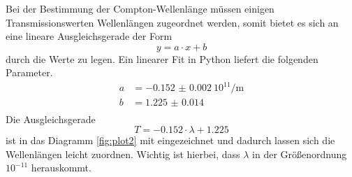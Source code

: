 Bei der Bestimmung der Compton-Wellenlänge müssen einigen Transmissionswerten Wellenlängen zugeordnet werden, somit bietet es sich an eine lineare Ausgleichsgerade der
Form
\begin{equation*}
y = a \cdot x + b
\end{equation*}
durch die Werte zu legen.
Ein linearer Fit in Python liefert die folgenden Parameter.
\begin{align*}
a &= \SI{-0.152(2)}{{10^{11}}\per\meter}\\
b &= \SI{1.225(14)}{}\\
\end{align*}
Die Ausgleichsgerade
\begin{equation}
\label{eqn:gerade}
T = -0.152 \cdot \lambda + 1.225
\end{equation}
ist in das Diagramm \ref{fig:plot2} mit eingezeichnet und dadurch lassen sich die Wellenlängen leicht zuordnen. Wichtig ist hierbei,
dass $\lambda$ in der Größenordnung $10^{-11}$ herauskommt.


